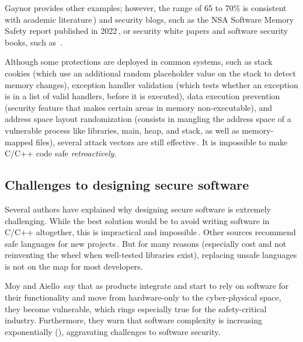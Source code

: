 \documentclass[nomenclature, english, bibtex]{kththesis}
\begin{document}
Gaynor provides other examples; however, the range of 65 to 70\% is consistent with academic literature\,\cite{mergendahl_cross-language_2022,scherer_engineering_2021, li_improving_2014}) and security blogs, such as the \gls{NSA} Software Memory Safety report published in 2022\,\cite{noauthor_nsa_2022}, or security white papers and software security books, such as~\cite{chapman_adacore_2018}.

Although some protections are deployed in common systems, such as stack cookies (which use an additional random placeholder value on the stack to detect memory changes), exception handler validation (which tests whether an exception is in a list
of valid handlers, before it is executed), data execution prevention (security feature that makes certain areas in memory non-executable), and address space layout randomization (consists in mangling the address space of a vulnerable process like libraries, main, heap, and stack, as well as memory-mapped files), several attack vectors are still effective\,\cite{szekeres_sok_2013}. It is impossible to make C/C++ code safe \emph{retroactively}. 

\subsection{Challenges to designing secure software}

Several authors have explained why designing secure software is extremely challenging. While the best solution would be to avoid writing software in C/C++ altogether, this is impractical and impossible\,\cite{szekeres_sok_2013}. Other sources recommend safe languages for new projects\,\cite{scherer_engineering_2021}. But for many reasons (especially cost and not reinventing the wheel when well-tested libraries exist), replacing unsafe languages is not on the map for most developers.

Moy and Aiello\,\cite{moy_when_2020} say that as products integrate and start to rely on software for their functionality and move from hardware-only to the cyber-physical space, they become vulnerable, which rings especially true for the \gls{safety-critical} industry. Furthermore, they warn that software complexity is increasing exponentially (\cite{moy_when_2020}), aggravating challenges to software security.
\end{document}
